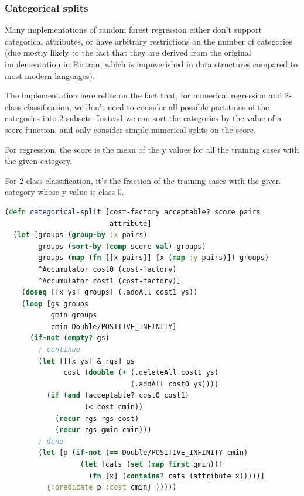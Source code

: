 \documentclass[10pt,openany]{article}
\numberwithin{definition}{section}
\numberwithin{example}{section}
\numberwithin{equation}{section}
\numberwithin{figure}{section}
\begin{document}
\subsubsection{Categorical splits}

Many implementations of random forest regression either don't support
categorical attributes, or have arbitrary restrictions on the number
of categories (due mostly likely to the fact that they are derived
from the original implementation in Fortran, which is impoverished
in data structures compared to most modern languages).

The implementation here relies on the fact that, for numerical regression
and 2-class classification, we don't need to consider all possible
partitions of the categories into 2 subsets. Instead we can sort the
categories by the value of a score function, and only consider simple
numerical splits on the score. 

For regression, the score is the mean of the y values for all the
training cases with the given category.

For 2-class classification, it's the fraction of the training cases
with the given category whose y value is class 0.

\begin{minipage}[t]{1\columnwidth}%
\begin{lstlisting}[caption={Optimal split on a categorical attribute},label={lis:categorical-split},language=clojure,tabsize=2]
(defn categorical-split [cost-factory acceptable? score pairs 
                         attribute]
  (let [groups (group-by :x pairs)
        groups (sort-by (comp score val) groups)
        groups (map (fn [[x pairs]] [x (map :y pairs)]) groups)
        ^Accumulator cost0 (cost-factory)
        ^Accumulator cost1 (cost-factory)]
    (doseq [[x ys] groups] (.addAll cost1 ys))
    (loop [gs groups
           gmin groups
           cmin Double/POSITIVE_INFINITY]
      (if-not (empty? gs)
        ; continue
        (let [[[x ys] & rgs] gs
              cost (double (+ (.deleteAll cost1 ys) 
                              (.addAll cost0 ys)))]
          (if (and (acceptable? cost0 cost1)
                   (< cost cmin))
            (recur rgs rgs cost)
            (recur rgs gmin cmin)))
        ; done
        (let [p (if-not (== Double/POSITIVE_INFINITY cmin)
                  (let [cats (set (map first gmin))]
                    (fn [x] (contains? cats (attribute x)))))]
          {:predicate p :cost cmin} )))))
\end{lstlisting}
%
\end{minipage}
\end{document}
